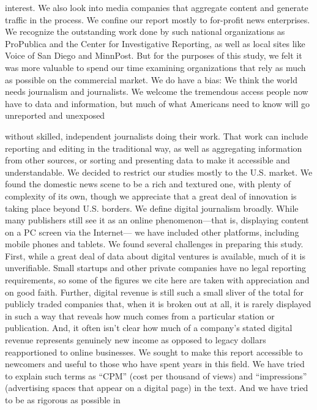 interest. We also look into media companies that aggregate content and generate
traffic in the process.
We confine our report mostly to for-profit news enterprises. We recognize
the outstanding work done by such national organizations as ProPublica and the
Center for Investigative Reporting, as well as local sites like Voice of San Diego
and MinnPost. But for the purposes of this study, we felt it was more valuable
to spend our time examining organizations that rely as much as possible on the
commercial market.
We do have a bias: We think the world needs journalism and journalists. We
welcome the tremendous access people now have to data and information, but
much of what Americans need to know will go unreported and unexposed

without skilled, independent journalists doing their work. That work can include
reporting and editing in the traditional way, as well as aggregating information
from other sources, or sorting and presenting data to make it accessible
and understandable.
We decided to restrict our studies mostly to the U.S. market. We found the
domestic news scene to be a rich and textured one, with plenty of complexity
of its own, though we appreciate that a great deal of innovation is taking place
beyond U.S. borders.
We define digital journalism broadly. While many publishers still see it as an
online phenomenon—that is, displaying content on a PC screen via the Internet—
we have included other platforms, including mobile phones and tablets.
We found several challenges in preparing this study. First, while a great deal of
data about digital ventures is available, much of it is unverifiable. Small startups
and other private companies have no legal reporting requirements, so some of
the figures we cite here are taken with appreciation and on good faith. Further,
digital revenue is still such a small sliver of the total for publicly traded companies
that, when it is broken out at all, it is rarely displayed in such a way that reveals
how much comes from a particular station or publication. And, it often isn't clear
how much of a company's stated digital revenue represents genuinely new income
as opposed to legacy dollars reapportioned to online businesses.
We sought to make this report accessible to newcomers and useful to those
who have spent years in this field. We have tried to explain such terms as ``CPM''
(cost per thousand of views) and ``impressions'' (advertising spaces that appear
on a digital page) in the text. And we have tried to be as rigorous as possible in
